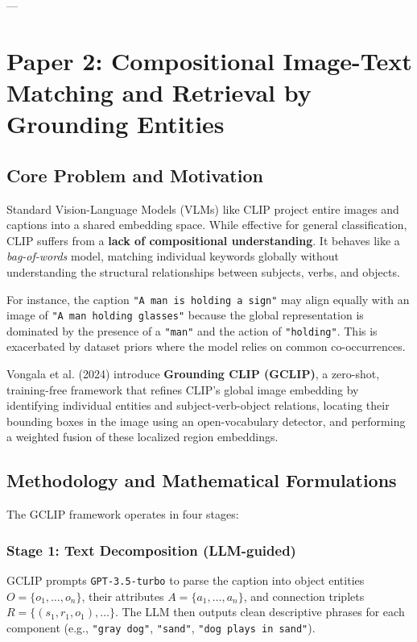 \documentclass[11pt,a4paper]{article}
\begin{document}
---

\section{Paper 2: Compositional Image-Text Matching and Retrieval by Grounding Entities}
\label{sec:paper2}

\subsection{Core Problem and Motivation}
Standard Vision-Language Models (VLMs) like CLIP project entire images and captions into a shared embedding space. While effective for general classification, CLIP suffers from a \textbf{lack of compositional understanding}. It behaves like a \textit{bag-of-words} model, matching individual keywords globally without understanding the structural relationships between subjects, verbs, and objects. 

For instance, the caption \texttt{"A man is holding a sign"} may align equally with an image of \texttt{"A man holding glasses"} because the global representation is dominated by the presence of a \texttt{"man"} and the action of \texttt{"holding"}. This is exacerbated by dataset priors where the model relies on common co-occurrences.

Vongala et al. (2024) introduce \textbf{Grounding CLIP (GCLIP)}, a zero-shot, training-free framework that refines CLIP's global image embedding by identifying individual entities and subject-verb-object relations, locating their bounding boxes in the image using an open-vocabulary detector, and performing a weighted fusion of these localized region embeddings.

\subsection{Methodology and Mathematical Formulations}
The GCLIP framework operates in four stages:

\subsubsection{Stage 1: Text Decomposition (LLM-guided)}
GCLIP prompts \texttt{GPT-3.5-turbo} to parse the caption into object entities $O = \{o_1, \dots, o_n\}$, their attributes $A = \{a_1, \dots, a_n\}$, and connection triplets $R = \{(s_1, r_1, o_1), \dots\}$. The LLM then outputs clean descriptive phrases for each component (e.g., \texttt{"gray dog"}, \texttt{"sand"}, \texttt{"dog plays in sand"}).
\end{document}
